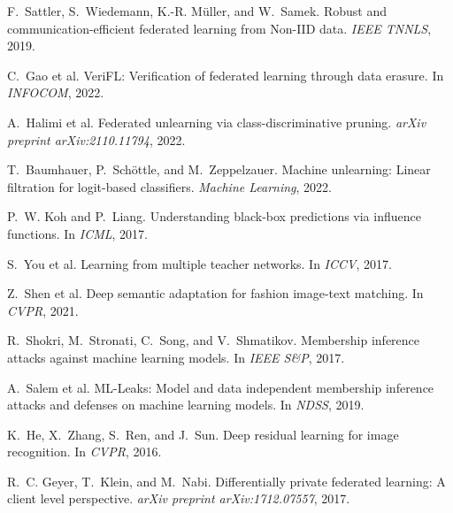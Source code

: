 \documentclass[10pt,twocolumn]{article}
\begin{document}
\begin{thebibliography}{99}
F.~Sattler, S.~Wiedemann, K.-R. Müller, and W.~Samek.
\newblock Robust and communication-efficient federated learning from Non-IID data.
\newblock \textit{IEEE TNNLS}, 2019.

C.~Gao et al.
\newblock VeriFL: Verification of federated learning through data erasure.
\newblock In \textit{INFOCOM}, 2022.

A.~Halimi et al.
\newblock Federated unlearning via class-discriminative pruning.
\newblock \textit{arXiv preprint arXiv:2110.11794}, 2022.

T.~Baumhauer, P.~Schöttle, and M.~Zeppelzauer.
\newblock Machine unlearning: Linear filtration for logit-based classifiers.
\newblock \textit{Machine Learning}, 2022.

P.~W. Koh and P.~Liang.
\newblock Understanding black-box predictions via influence functions.
\newblock In \textit{ICML}, 2017.

S.~You et al.
\newblock Learning from multiple teacher networks.
\newblock In \textit{ICCV}, 2017.

Z.~Shen et al.
\newblock Deep semantic adaptation for fashion image-text matching.
\newblock In \textit{CVPR}, 2021.

R.~Shokri, M.~Stronati, C.~Song, and V.~Shmatikov.
\newblock Membership inference attacks against machine learning models.
\newblock In \textit{IEEE S\&P}, 2017.

A.~Salem et al.
\newblock ML-Leaks: Model and data independent membership inference attacks and defenses on machine learning models.
\newblock In \textit{NDSS}, 2019.

K.~He, X.~Zhang, S.~Ren, and J.~Sun.
\newblock Deep residual learning for image recognition.
\newblock In \textit{CVPR}, 2016.

R.~C. Geyer, T.~Klein, and M.~Nabi.
\newblock Differentially private federated learning: A client level perspective.
\newblock \textit{arXiv preprint arXiv:1712.07557}, 2017.

\end{thebibliography}
\end{document}
